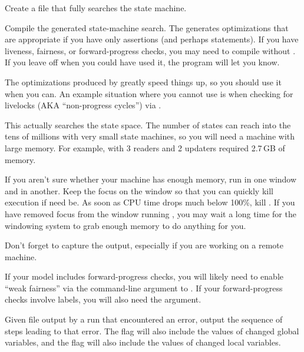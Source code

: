 \begin{description}[style=nextline]
\item	[\tco{spin -a qrcu.spin}]
	Create a file  that fully searches the state machine.
\item	[\tco{cc -DSAFETY -o pan pan.c}]
	Compile the generated state-machine search.  The 
	generates optimizations that are appropriate if you have only
	assertions (and perhaps  statements).  If you have
	liveness, fairness, or forward-progress checks, you may need
	to compile without .  If you leave off 
	when you could have used it, the program will let you know.

	The optimizations produced by  greatly speed things
	up, so you should use it when you can.
	An example situation where you cannot use  is
	when checking for livelocks (AKA ``non-progress cycles'')
	via .
\item	[\tco{./pan}]
	This actually searches the state space.  The number of states
	can reach into the tens of millions with very small state
	machines, so you will need a machine with large memory.
	For example,  with 3 readers and 2 updaters required
	2.7\,GB of memory.

	If you aren't sure whether your machine has enough memory,
	run  in one window and  in another.  Keep the
	focus on the  window so that you can quickly kill
	execution if need be.  As soon as CPU time drops much below
	100\%, kill .  If you have removed focus from the
	window running , you may wait a long time for the
	windowing system to grab enough memory to do anything for
	you.

	Don't forget to capture the output, especially
	if you are working on a remote machine.

	If your model includes forward-progress checks, you will likely
	need to enable ``weak fairness'' via the  command-line
	argument to .
	If your forward-progress checks involve  labels,
	you will also need the  argument.
\item	[\tco{spin -t -p qrcu.spin}]
	Given  file output by a run that encountered an
	error, output the sequence of steps leading to that error.
	The  flag will also include the values of changed
	global variables, and the   flag will also include
	the values of changed local variables.
\end{description}


